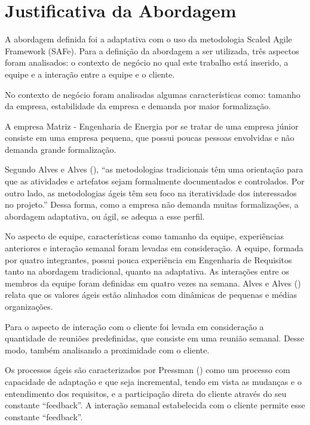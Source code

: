 \chapter[Justificativa]{Justificativa da Abordagem}



A abordagem definida foi a adaptativa com o uso da metodologia Scaled Agile Framework (SAFe). Para a definição da abordagem a ser utilizada, 
três aspectos foram analisados: o contexto de negócio no qual este trabalho está inserido,
a equipe e a interação entre a equipe e o cliente.

No contexto de negócio foram analisadas algumas características como: tamanho da empresa,
estabilidade da empresa e demanda por maior formalização.

A empresa Matriz - Engenharia de Energia por se tratar de uma empresa júnior consiste
em uma empresa pequena, que possui poucas pessoas envolvidas e não demanda grande formalização.

Segundo Alves e Alves (\citeyear{alves}), ``as metodologias tradicionais têm uma orientação
para que as atividades e artefatos sejam formalmente documentados e controlados. Por outro lado, as metodologias ágeis têm seu foco
na iteratividade dos interessados no projeto.'' Dessa forma, como a empresa não demanda muitas formalizações, a abordagem adaptativa, ou ágil,
se adequa a esse perfil.

No aspecto de equipe, características como tamanho da equipe, experiências anteriores e interação semanal 
foram levadas em consideração. A equipe, formada por quatro integrantes, possui pouca experiência 
em Engenharia de Requisitos tanto na abordagem tradicional, quanto na adaptativa. 
As interações entre os membros da equipe foram definidas em quatro vezes na semana.
Alves e Alves (\citeyear{alves}) relata que os valores ágeis estão alinhados com dinâmicas de pequenas e médias organizações.

Para o aspecto de interação com o cliente foi levada em consideração a quantidade de
reuniões predefinidas, que consiste em uma reunião semanal. Desse modo, também analisando 
a proximidade com o cliente.

Os processos ágeis são caracterizados por Pressman (\citeyear{pressman}) como um
processo com capacidade de adaptação e que seja incremental, tendo em vista as
mudanças e o entendimento dos requisitos, e a participação direta do cliente através
do seu constante “feedback”. A interação semanal estabelecida com o cliente permite esse constante
“feedback”.

